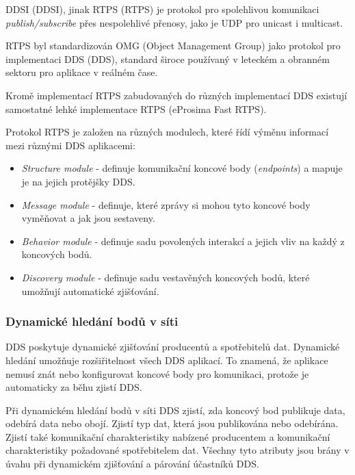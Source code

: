 \acs{DDSI} (\acl{DDSI}), jinak \acs{RTPS} (\acl{RTPS}) je protokol pro spolehlivou komunikaci \textit{publish/subscribe} přes nespolehlivé přenosy, jako je UDP pro unicast i multicast. \cite{DDS_Standard}

\acs{RTPS} byl standardizován OMG (Object Management Group) jako protokol pro implementaci \acl{DDS} (\acs{DDS}), standard široce používaný v leteckém a obranném sektoru pro aplikace v reálném čase.

Kromě implementací \acs{RTPS} zabudovaných do různých implementací \acs{DDS} existují samostatné lehké implementace \acs{RTPS} (eProsima Fast \acs{RTPS}).

Protokol RTPS je založen na různých modulech, které řídí výměnu informací mezi různými \acs{DDS} aplikacemi: \cite{Eprosima}

\begin{itemize}
    \item \textit{Structure module} - definuje komunikační koncové body (\textit{endpoints}) a mapuje je na jejich protějšky \acs{DDS}.
    \item \textit{Message module} - definuje, které zprávy si mohou tyto koncové body vyměňovat a jak jsou sestaveny.
    \item \textit{Behavior module} - definuje sadu povolených interakcí a jejich vliv na každý z koncových bodů.
    \item \textit{Discovery module} - definuje sadu vestavěných koncových bodů, které umožňují automatické zjišťování.
\end{itemize}

\subsubsection{Dynamické hledání bodů v síti}

\acs{DDS} poskytuje dynamické zjišťování producentů a spotřebitelů dat. Dynamické hledání umožňuje rozšiřitelnost všech \acs{DDS} aplikací. To znamená, že aplikace nemusí znát nebo konfigurovat koncové body pro komunikaci, protože je automaticky za běhu zjistí \acs{DDS}.

Při dynamickém hledání bodů v síti \acs{DDS} zjistí, zda koncový bod publikuje data, odebírá data nebo obojí. Zjistí typ dat, která jsou publikována nebo odebírána. Zjistí také komunikační charakteristiky nabízené producentem a komunikační charakteristiky požadované spotřebitelem dat. Všechny tyto atributy jsou brány v úvahu při dynamickém zjišťování a párování účastníků \acs{DDS}. \cite{DDS_Main}

